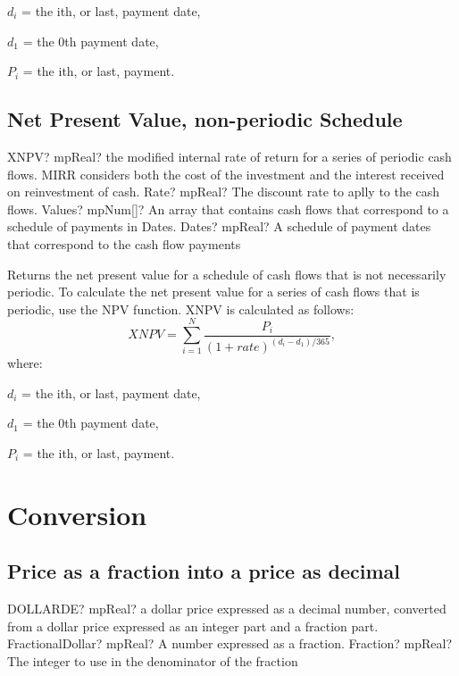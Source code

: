 $d_i$ = the ith, or last, payment date,

$d_1$ = the 0th payment date,

$P_i$ = the ith, or last, payment.




\subsection{Net Present Value, non-periodic Schedule}


\begin{mpFunctionsExtract}
	\mpWorksheetFunctionThreeNotImplemented
	{XNPV? mpReal? the modified internal rate of return for a series of periodic cash flows. MIRR considers both the cost of the investment and the interest received on reinvestment of cash.}
	{Rate? mpReal? The discount rate to aplly to the cash flows.}
	{Values? mpNum[]? An array that contains cash flows that correspond to a schedule of payments in Dates.}
	{Dates? mpReal? A schedule of payment dates that correspond to the cash flow payments}
\end{mpFunctionsExtract}

\vspace{0.3cm}
Returns the net present value for a schedule of cash flows that is not necessarily periodic. To calculate the net present value for a series of cash flows that is periodic, use the NPV function. XNPV is calculated as follows: 
\begin{equation}
XNPV = \sum_{i=1}^N \frac{P_i}{(1+rate)^{(d_i-d_1)/365}},
\end{equation}
where:

$d_i$ = the ith, or last, payment date,

$d_1$ = the 0th payment date,

$P_i$ = the ith, or last, payment.



\newpage
\section{Conversion}

\subsection{Price as a fraction into a price as decimal}

\begin{mpFunctionsExtract}
	\mpWorksheetFunctionTwoNotImplemented
	{DOLLARDE? mpReal? a dollar price expressed as a decimal number, converted from a dollar price expressed as an integer part and a fraction part.}
	{FractionalDollar? mpReal? A number expressed as a fraction.}
	{Fraction? mpReal? The integer to use in the denominator of the fraction}
\end{mpFunctionsExtract}

